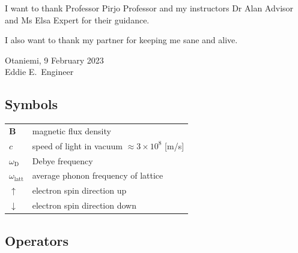 \documentclass[english, 12pt, a4paper, biz, utf8, a-2b, online]{aaltothesis}
\begin{document}


\dothesispagenumbering{}

I want to thank Professor Pirjo Professor and my instructors Dr Alan Advisor and
Ms Elsa Expert for their guidance.

I also want to thank my partner for keeping me sane and alive.

\vspace{5cm}
Otaniemi, 9 February 2023\\

\vspace{5mm}
{\hfill Eddie E.\ Engineer \hspace{1cm}}

\newpage


\thesistableofcontents




\subsection*{Symbols}

\begin{tabular}{ll}
$\mathbf{B}$  & magnetic flux density  \\
$c$              & speed of light in vacuum $\approx 3\times10^8$ [m/s]\\
$\omega_{\mathrm{D}}$    & Debye frequency \\
$\omega_{\mathrm{latt}}$ & average phonon frequency of lattice \\
$\uparrow$       & electron spin direction up\\
$\downarrow$     & electron spin direction down
\end{tabular}

\subsection*{Operators}
\end{document}
